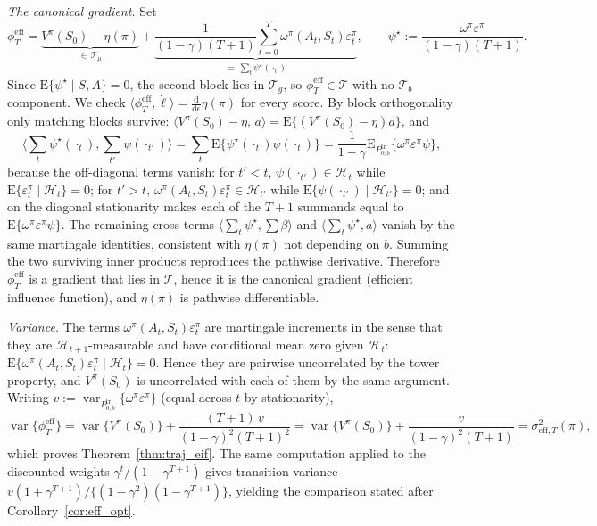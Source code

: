 \documentclass[12pt]{article}
\theoremstyle{remark}\newtheorem{remark}[theorem]{Remark}\theoremstyle{plain}
\newcommand{\E}{\mathrm{E}}
\newcommand{\var}{\operatorname{var}}
\begin{document}
\emph{The canonical gradient.}  Set
\[
    \phi^{\mathrm{eff}}_T
    =\underbrace{V^\pi(S_0)-\eta(\pi)}_{\in\,\mathcal T_\mu}
    +\underbrace{\frac{1}{(1-\gamma)(T+1)}
    \sum_{t=0}^T\omega^\pi(A_t,S_t)\varepsilon^\pi_t}
    _{=\,\sum_t\psi^\star(\cdot_t)},
    \qquad
    \psi^\star:=\frac{\omega^\pi\varepsilon^\pi}{(1-\gamma)(T+1)} .
\]
Since $\E\{\psi^\star\mid S,A\}=0$, the second block lies in
$\mathcal T_g$, so $\phi^{\mathrm{eff}}_T\in\mathcal T$ with no
$\mathcal T_b$ component.  We check
$\langle\phi^{\mathrm{eff}}_T,\dot\ell\rangle
=\frac{\mathrm d}{\mathrm d\epsilon}\eta(\pi)$ for every score.  By
block orthogonality only matching blocks survive:
$\langle V^\pi(S_0)-\eta,\,a\rangle=\E\{(V^\pi(S_0)-\eta)a\}$, and
\[
    \Big\langle\sum_t\psi^\star(\cdot_t),
    \sum_{t'}\psi(\cdot_{t'})\Big\rangle
    =\sum_{t}\E\{\psi^\star(\cdot_t)\psi(\cdot_t)\}
    =\frac{1}{1-\gamma}
    \E_{P_{0,b}^{\mathrm{tr}}}\{\omega^\pi\varepsilon^\pi\psi\},
\]
because the off-diagonal terms vanish: for $t'<t$,
$\psi(\cdot_{t'})\in\mathcal H_t$ while
$\E\{\varepsilon^\pi_t\mid\mathcal H_t\}=0$; for $t'>t$,
$\omega^\pi(A_t,S_t)\varepsilon^\pi_t\in\mathcal H_{t'}$ while
$\E\{\psi(\cdot_{t'})\mid\mathcal H_{t'}\}=0$; and on the diagonal
stationarity makes each of the $T+1$ summands equal to
$\E\{\omega^\pi\varepsilon^\pi\psi\}$.  The remaining cross terms
$\langle\sum_t\psi^\star,\sum\beta\rangle$ and
$\langle\sum_t\psi^\star,a\rangle$ vanish by the same martingale
identities, consistent with $\eta(\pi)$ not depending on $b$.  Summing
the two surviving inner products reproduces the pathwise derivative.
Therefore $\phi^{\mathrm{eff}}_T$ is a gradient that lies in
$\mathcal T$, hence it is the canonical gradient (efficient influence
function), and $\eta(\pi)$ is pathwise differentiable.

\emph{Variance.}  The terms $\omega^\pi(A_t,S_t)\varepsilon^\pi_t$ are
martingale increments in the sense that they are
$\mathcal H_{t+1}^-$-measurable and have conditional mean zero given
$\mathcal H_t$:
$\E\{\omega^\pi(A_t,S_t)\varepsilon^\pi_t\mid\mathcal H_t\}=0$.  Hence
they are pairwise uncorrelated by the tower property, and
$V^\pi(S_0)$ is uncorrelated with each of them by the same argument.
Writing
$v:=\var_{P_{0,b}^{\mathrm{tr}}}\{\omega^\pi\varepsilon^\pi\}$ (equal
across $t$ by stationarity),
\[
    \var\{\phi^{\mathrm{eff}}_T\}
    =\var\{V^\pi(S_0)\}
    +\frac{(T+1)\,v}{(1-\gamma)^2(T+1)^2}
    =\var\{V^\pi(S_0)\}+\frac{v}{(1-\gamma)^2(T+1)}
    =\sigma^2_{\mathrm{eff},T}(\pi),
\]
which proves Theorem~\ref{thm:traj_eif}.  The same computation applied
to the discounted weights $\gamma^t/(1-\gamma^{T+1})$ gives transition
variance $v(1+\gamma^{T+1})/\{(1-\gamma^2)(1-\gamma^{T+1})\}$, yielding
the comparison stated after Corollary~\ref{cor:eff_opt}.
\end{document}

